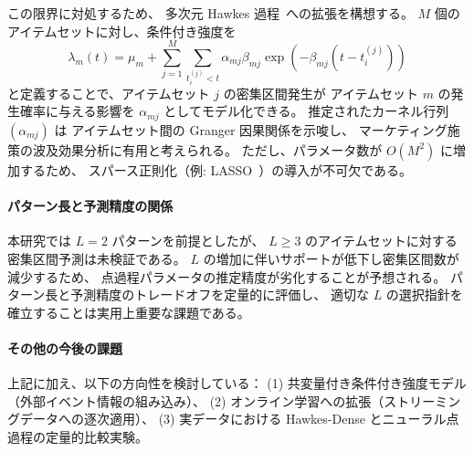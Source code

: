 この限界に対処するため、
多次元 Hawkes 過程~\cite{zhou2013learning}への拡張を構想する。
$M$ 個のアイテムセットに対し、条件付き強度を
\begin{equation}
  \lambda_m(t) = \mu_m + \sum_{j=1}^{M} \sum_{t_i^{(j)} < t}
  \alpha_{mj} \beta_{mj} \exp(-\beta_{mj}(t - t_i^{(j)}))
\end{equation}
と定義することで、アイテムセット $j$ の密集区間発生が
アイテムセット $m$ の発生確率に与える影響を
$\alpha_{mj}$ としてモデル化できる。
推定されたカーネル行列 $(\alpha_{mj})$ は
アイテムセット間の Granger 因果関係を示唆し、
マーケティング施策の波及効果分析に有用と考えられる。
ただし、パラメータ数が $O(M^2)$ に増加するため、
スパース正則化（例: LASSO~\cite{zhou2013learning}）の導入が不可欠である。

\paragraph{パターン長と予測精度の関係}
本研究では $L=2$ パターンを前提としたが、
$L \geq 3$ のアイテムセットに対する密集区間予測は未検証である。
$L$ の増加に伴いサポートが低下し密集区間数が減少するため、
点過程パラメータの推定精度が劣化することが予想される。
パターン長と予測精度のトレードオフを定量的に評価し、
適切な $L$ の選択指針を確立することは実用上重要な課題である。

\paragraph{その他の今後の課題}
上記に加え、以下の方向性を検討している：
(1) 共変量付き条件付き強度モデル（外部イベント情報の組み込み）、
(2) オンライン学習への拡張（ストリーミングデータへの逐次適用）、
(3) 実データにおける Hawkes-Dense とニューラル点過程の定量的比較実験。
